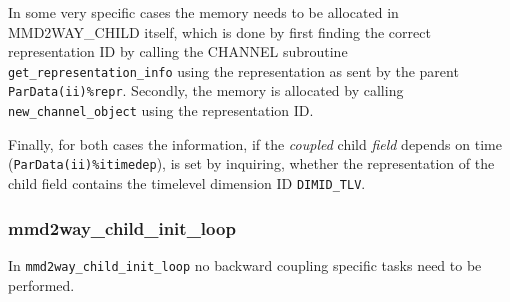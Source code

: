 \documentclass[11pt,twoside]{article}
\begin{document}
\begin{enumerate}
In some very specific cases the memory needs to be allocated in MMD2WAY\_CHILD
itself, which is done by first finding the correct representation ID  by
calling the CHANNEL subroutine \verb|get_representation_info| using the
representation as sent by the parent \verb|ParData(ii)%repr|.
Secondly, the memory is allocated by calling \verb|new_channel_object| using
the representation ID.

Finally, for both cases the information, if the {\it coupled} child
 {\it field}
depends on time (\verb|ParData(ii)%itimedep|), is set by inquiring, whether
the representation of the child field contains the timelevel dimension
ID \verb|DIMID_TLV|.
\end{enumerate}

\subsubsection{mmd2way\_child\_init\_loop }
In \verb|mmd2way_child_init_loop| no backward coupling specific tasks
need to be performed. 
\end{document}
